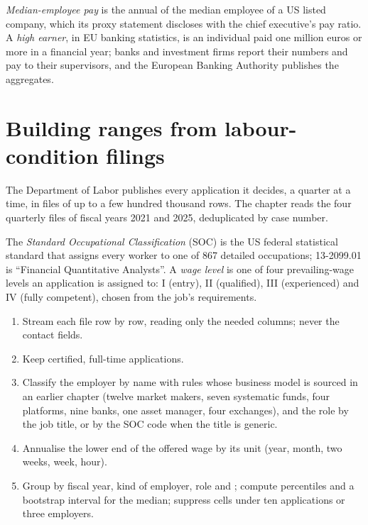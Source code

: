 \begin{definition}\label{def:in:pay-levels-by-role-firm-type-and-seniority:median}
\emph{Median-employee pay} is the annual  of the median employee of a US
listed company, which its proxy statement discloses with the chief executive's pay ratio. A \emph{high
earner}, in EU banking statistics, is an individual paid one million euros or more in a financial
year; banks and investment firms report their numbers and pay to their supervisors, and the European Banking Authority
publishes the aggregates.
\end{definition}

\section{Building ranges from labour-condition filings}

The Department of Labor publishes every application it decides, a quarter at a time, in files of up to a few hundred
thousand rows. The chapter reads the four quarterly files of fiscal years 2021 and 2025, deduplicated by case number.

\begin{definition}\label{def:in:pay-levels-by-role-firm-type-and-seniority:soc}
The \emph{Standard Occupational Classification} (SOC) is the US federal
statistical standard that assigns every worker to one of 867 detailed occupations; 13-2099.01 is ``Financial
Quantitative Analysts''. A \emph{wage level} is one of four prevailing-wage levels an application is
assigned to: I (entry), II (qualified), III (experienced) and IV (fully competent), chosen from the job's requirements.
\end{definition}

\begin{method}\label{met:in:pay-levels-by-role-firm-type-and-seniority:lca}
\begin{enumerate}
\item Stream each file row by row, reading only the needed columns; never the contact fields.
\item Keep certified, full-time applications.
\item Classify the employer by name with rules whose business model is sourced in an earlier chapter (twelve market
makers, seven systematic funds, four platforms, nine banks, one asset manager, four exchanges), and the role by the job
title, or by the SOC code when the title is generic.
\item Annualise the lower end of the offered wage by its unit (year, month, two weeks, week, hour).
\item Group by fiscal year, kind of employer, role and ; compute percentiles and a bootstrap interval for the
median; suppress cells under ten applications or three employers.
\end{enumerate}
\end{method}

